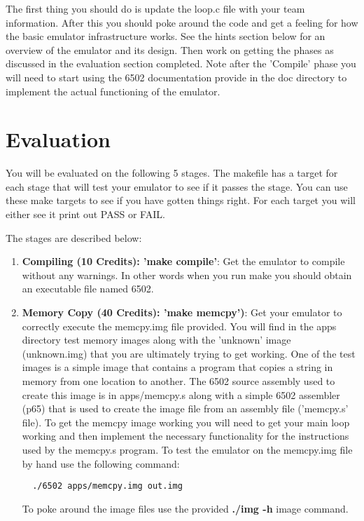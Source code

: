 \documentclass[11pt]{article}
\begin{document}
{The first thing you should do is update the loop.c file with your team
information.  After this you should poke around the code and get a
feeling for how the basic emulator infrastructure works.  See the
hints section below for an overview of the emulator and its design.
Then work on getting the phases as discussed in the evaluation section
completed.  Note after the 'Compile' phase you will need to start
using the 6502 documentation provide in the doc directory to
implement the actual functioning of the emulator.


\section{Evaluation}

You will be evaluated on the following 5 stages.  The makefile has a
target for each stage that will test your emulator to see if it passes
the stage.  You can use these make targets to see if you have gotten
things right. For each target you will either see it print out PASS or
FAIL.

The stages are described below:

\begin{enumerate}
\item {\bf Compiling (10 Credits): 'make compile'}: Get the emulator to
  compile without any warnings.  In other words when you run make you
  should obtain an executable file named 6502.  

\item{\bf Memory Copy (40 Credits): 'make memcpy')}: Get your emulator
  to correctly execute the memcpy.img file provided.  You will find in
  the apps directory test memory images along with the 'unknown' image
  (unknown.img) that you are ultimately trying to get working.  One of
  the test images is a simple image that contains a program that
  copies a string in memory from one location to another.  The 6502
  source assembly used to create this image is in apps/memcpy.s along
  with a simple 6502 assembler (p65) that is used to create the image
  file from an assembly file ('memcpy.s' file).  To get the memcpy image
  working you will need to get your main loop working and then
  implement the necessary functionality for the instructions used by
  the memcpy.s program.  To test the emulator on the memcpy.img file
  by hand use the following command:  
\begin{center}
\begin{verbatim}
  ./6502 apps/memcpy.img out.img
\end{verbatim}
\end{center}
  To poke around the image files use the provided {\bf ./img -h} image
  command. 


\end{enumerate}}
\end{document}
